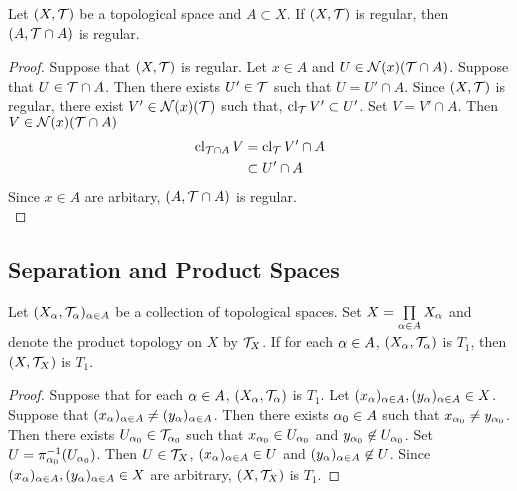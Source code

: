 \documentclass{book}
\begin{document}
	\begin{ex}
		Let $(X, \mathcal{T})$ be a topological space and $A \subset X$. If $(X, \mathcal{T})$ is regular, then $(A, \mathcal{T} \cap A)$ is regular.
	\end{ex}
	
	\begin{proof}
		Suppose that $(X, \mathcal{T})$ is regular. Let $x \in A$ and $U \in \mathcal{N}(x)(\mathcal{T} \cap A)$. Suppose that $U \in \mathcal{T} \cap A$. Then there exists $U' \in \mathcal{T}$ such that $U = U' \cap A$. Since $(X, \mathcal{T})$ is regular, there exist $V' \in \mathcal{N}(x)(\mathcal{T})$ such that, $\operatorname{cl}_{\mathcal{T}} V' \subset U'$. Set $V = V' \cap A$. Then $V \in \mathcal{N}(x)(\mathcal{T} \cap A)$   
		\begin{align*}
			\operatorname{cl}_{\mathcal{T} \cap A} V
			& = \operatorname{cl}_{\mathcal{T}} V' \cap A \\
			& \subset U' \cap A
		\end{align*}
		Since $x \in A$ are arbitary, $(A, \mathcal{T} \cap A)$ is regular. \\
	\end{proof}































	\subsection{Separation and Product Spaces}
	
	\begin{ex}
		Let $(X_{\alpha}, \mathcal{T}_{\alpha})_{\alpha \in A}$ be a collection of topological spaces. Set $X = \prod\limits_{\alpha \in A} X_{\alpha}$ and denote the product topology on $X$ by $\mathcal{T}_X$. If for each $\alpha \in A$, $(X_{\alpha}, \mathcal{T}_{\alpha})$ is $T_1$, then $(X, \mathcal{T}_X)$ is $T_1$.
	\end{ex}
	
	\begin{proof}
		Suppose that for each $\alpha \in A$, $(X_{\alpha}, \mathcal{T}_{\alpha})$ is $T_1$. Let $(x_{\alpha})_{\alpha \in A}, (y_{\alpha})_{\alpha \in A} \in X$. Suppose that $(x_{\alpha})_{\alpha \in A} \neq (y_{\alpha})_{\alpha \in A}$. Then there exists $\alpha_0 \in A$ such that $x_{\alpha_0} \neq y_{\alpha_0}$. Then there exists $U_{\alpha_0} \in \mathcal{T}_{\alpha_0}$ such that $x_{\alpha_0} \in U_{\alpha_0}$ and $y_{\alpha_0} \not \in U_{\alpha_0}$. Set $U = \pi_{\alpha_0}^{-1}(U_{\alpha_0})$. Then $U \in \mathcal{T}_X$, $(x_{\alpha})_{\alpha \in A} \in U$ and $(y_{\alpha})_{\alpha \in A} \not \in U$. Since $(x_{\alpha})_{\alpha \in A}, (y_{\alpha})_{\alpha \in A} \in X$ are arbitrary, $(X, \mathcal{T}_X)$ is $T_1$.
	\end{proof}
	
\end{document}
